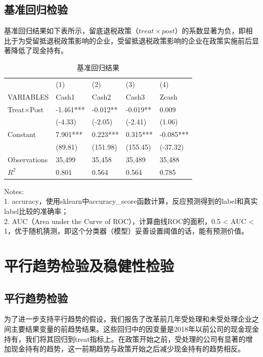 \documentclass{article}
\begin{document}
\subsection{基准回归检验}
基准回归结果如下表所示，留底退税政策（$treat \times post$）的系数显著为负，即相比于为受留抵退税政策影响的企业，受留抵退税政策影响的企业在政策实施前后显著降低了现金持有。


\begin{table}[H]
    \centering
    \caption{基准回归结果}
    \begin{tabular}{@{}lllll@{}}
    \toprule
                 & (1)       & (2)      & (3)      & (4)       \\ \cmidrule(l){2-5} 
    VARIABLES    & Cash1     & Cash2    & Cash3    & Zcash     \\ \midrule
    Treat×Post   & -1.461*** & -0.012** & -0.019** & 0.009     \\
                 & (-4.33)   & (-2.05)  & (-2.41)  & (1.06)    \\
    Constant     & 7.901***  & 0.223*** & 0.315*** & -0.085*** \\
                 & (89.81)   & (151.98) & (155.45) & (-37.32)  \\
    Observations & 35,499    & 35,458   & 35,489   & 35,488    \\
    $R^2$    & 0.801     & 0.564    & 0.564    & 0.785     \\ \bottomrule
    \end{tabular}
    \begin{tablenotes}
        \item Notes:\\
        1. accuracy，使用sklearn中accuracy\_score函数计算，反应预测得到的label和真实label比较的准确率；\\
        2. AUC（Area under the Curve of ROC），计算曲线ROC的面积，0.5 < AUC < 1，优于随机猜测，即这个分类器（模型）妥善设置阈值的话，能有预测价值。
    \end{tablenotes}
\end{table}

\section{平行趋势检验及稳健性检验}
\subsection{平行趋势检验} 
为了进一步支持平行趋势的假设，我们报告了改革前几年受处理和未受处理企业之间主要结果变量的前趋势结果。这些回归中的因变量是2018年以前公司的现金现金持有，我们将其回归到treat指标上。在政策开始之前，受处理的公司有显著的增加现金持有的趋势，这一前期趋势与政策开始之后减少现金持有的趋势相反。
\end{document}
